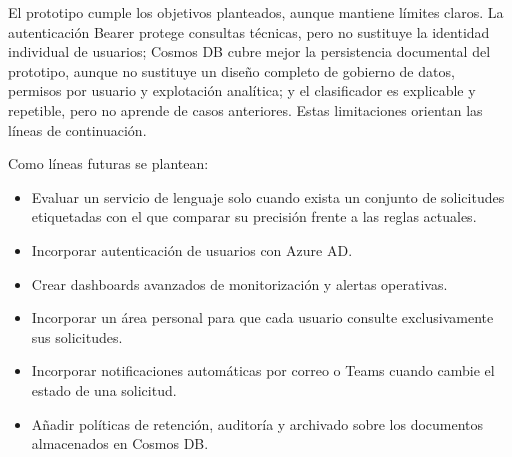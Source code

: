 El prototipo cumple los objetivos planteados, aunque mantiene límites claros. La autenticación Bearer protege consultas técnicas, pero no sustituye la identidad individual de usuarios; Cosmos DB cubre mejor la persistencia documental del prototipo, aunque no sustituye un diseño completo de gobierno de datos, permisos por usuario y explotación analítica; y el clasificador es explicable y repetible, pero no aprende de casos anteriores. Estas limitaciones orientan las líneas de continuación.

Como líneas futuras se plantean:

\begin{itemize}
    \item Evaluar un servicio de lenguaje solo cuando exista un conjunto de solicitudes etiquetadas con el que comparar su precisión frente a las reglas actuales.
    \item Incorporar autenticación de usuarios con Azure AD.
    \item Crear dashboards avanzados de monitorización y alertas operativas.
    \item Incorporar un área personal para que cada usuario consulte exclusivamente sus solicitudes.
    \item Incorporar notificaciones automáticas por correo o Teams cuando cambie el estado de una solicitud.
    \item Añadir políticas de retención, auditoría y archivado sobre los documentos almacenados en Cosmos DB.
\end{itemize}
